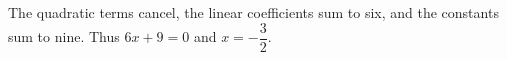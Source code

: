 The quadratic terms cancel, the linear coefficients sum to six, and the constants sum to nine. Thus $ 6x+9=0 $ and $\boxed{x=-\dfrac{3}{2}}$.
